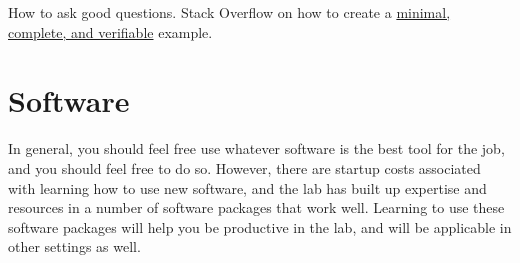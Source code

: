 \documentclass{tufte-book}
\begin{document}
How to ask good questions. Stack Overflow on how to create a
\href{https://stackoverflow.com/help/mcve}{minimal, complete, and
  verifiable} example.

\section{Software}

In general, you should feel free use whatever software is the best
tool for the job, and you should feel free to do so. However, there are
startup costs associated with learning how to use new software, and
the lab has built up expertise and resources in a number of software
packages that work well. Learning to use these software packages will
help you be productive in the lab, and will be applicable in other
settings as well.
\end{document}

